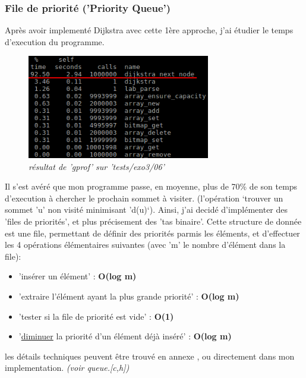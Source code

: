 \documentclass[10pt]{article}
\begin{document}
			\subsubsection{File de priorité ('Priority Queue')}
				Après avoir implementé Dijkstra avec cette 1ère approche, j'ai étudier le temps d'execution du programme.
				\begin{figure}[!h]
					\begin{center}
						\includegraphics[width=8cm,height=\textheight,keepaspectratio]{./images/no_pqueue.png}
					\end{center}
				    \caption{\textit{résultat de 'gprof' sur 'tests/exo3/06'}}
				\end{figure}
				Il s'est avéré que mon programme passe, en moyenne,
				plus de 70\% de son temps d'execution à chercher le prochain sommet à visiter.
				(l'opération `trouver un sommet 'u' non visité minimisant 'd(u)`).\newline\newline
				Ainsi, j'ai decidé d'implémenter des 'files de priorités', et plus précisement des 'tas binaire'.
				Cette structure de donnée est une file, permettant de définir des priorités parmis les éléments,
				et d'effectuer les 4 opérations élémentaires suivantes (avec 'm' le nombre d'élément dans la file):
				\begin{itemize}[label=-]
					\item 'insérer un élément' : \textbf{O(log m)}
					\item 'extraire l'élément ayant la plus grande priorité' : \textbf{O(log m)}
					\item 'tester si la file de priorité est vide' : \textbf{O(1)}
					\item '\underline{diminuer} la priorité d'un élément déjà inséré' : \textbf{O(log m)}
				\end{itemize}
				les détails techniques peuvent être trouvé en annexe \cite{binary_heap},
				ou directement dans mon implementation. \textit{(voir queue.[c,h])}
\end{document}
